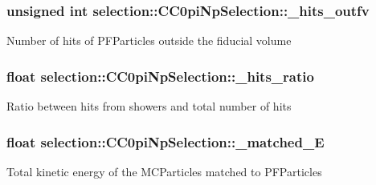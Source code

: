 \subsubsection[{\texorpdfstring{\+\_\+hits\+\_\+outfv}{_hits_outfv}}]{\setlength{\rightskip}{0pt plus 5cm}unsigned int selection\+::\+C\+C0pi\+Np\+Selection\+::\+\_\+hits\+\_\+outfv\hspace{0.3cm}{\ttfamily [private]}}\hypertarget{classselection_1_1CC0piNpSelection_ac39ec79d190fb925f8d20b03cbeb0605}{}\label{classselection_1_1CC0piNpSelection_ac39ec79d190fb925f8d20b03cbeb0605}
Number of hits of P\+F\+Particles outside the fiducial volume 
\subsubsection[{\texorpdfstring{\+\_\+hits\+\_\+ratio}{_hits_ratio}}]{\setlength{\rightskip}{0pt plus 5cm}float selection\+::\+C\+C0pi\+Np\+Selection\+::\+\_\+hits\+\_\+ratio\hspace{0.3cm}{\ttfamily [private]}}\hypertarget{classselection_1_1CC0piNpSelection_a32b43003c9168115bc94544049e439a2}{}\label{classselection_1_1CC0piNpSelection_a32b43003c9168115bc94544049e439a2}
Ratio between hits from showers and total number of hits 
\subsubsection[{\texorpdfstring{\+\_\+matched\+\_\+E}{_matched_E}}]{\setlength{\rightskip}{0pt plus 5cm}float selection\+::\+C\+C0pi\+Np\+Selection\+::\+\_\+matched\+\_\+E\hspace{0.3cm}{\ttfamily [private]}}\hypertarget{classselection_1_1CC0piNpSelection_ac75aa3ac33061bbdd378594ee7e6e2e5}{}\label{classselection_1_1CC0piNpSelection_ac75aa3ac33061bbdd378594ee7e6e2e5}
Total kinetic energy of the M\+C\+Particles matched to P\+F\+Particles 
